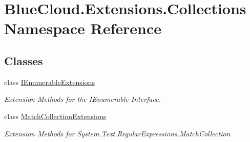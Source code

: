 \hypertarget{namespace_blue_cloud_1_1_extensions_1_1_collections}{}\section{Blue\+Cloud.\+Extensions.\+Collections Namespace Reference}
\label{namespace_blue_cloud_1_1_extensions_1_1_collections}
\subsection*{Classes}
\begin{DoxyCompactItemize}
\item 
class \mbox{\hyperlink{class_blue_cloud_1_1_extensions_1_1_collections_1_1_i_enumerable_extensions}{I\+Enumerable\+Extensions}}
\begin{DoxyCompactList}\small\item\em Extension Methods for the I\+Enumerable Interface. \end{DoxyCompactList}\item 
class \mbox{\hyperlink{class_blue_cloud_1_1_extensions_1_1_collections_1_1_match_collection_extensions}{Match\+Collection\+Extensions}}
\begin{DoxyCompactList}\small\item\em Extension Methods for System.\+Text.\+Regular\+Expressions.\+Match\+Collection \end{DoxyCompactList}\end{DoxyCompactItemize}
